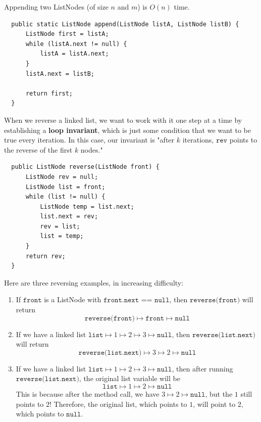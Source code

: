   \begin{theorem}[Appending]
  Appending two ListNodes (of size $n$ and $m$) is $O(n)$ time.
  \begin{lstlisting}
  public static ListNode append(ListNode listA, ListNode listB) {
      ListNode first = listA; 
      while (listA.next != null) {
          listA = listA.next; 
      }
      listA.next = listB; 
      
      return first; 
  }
  \end{lstlisting}
  \end{theorem}

  \begin{theorem}[Reversing]
  When we reverse a linked list, we want to work with it one step at a time by establishing a \textbf{loop invariant}, which is just some condition that we want to be true every iteration. In this case, our invariant is "after $k$ iterations, $\texttt{rev}$ points to the reverse of the first $k$ nodes." 
  \begin{lstlisting}
  public ListNode reverse(ListNode front) {
      ListNode rev = null; 
      ListNode list = front; 
      while (list != null) {
          ListNode temp = list.next; 
          list.next = rev; 
          rev = list; 
          list = temp; 
      }
      return rev; 
  }
  \end{lstlisting}
  \end{theorem}

  \begin{example}
  Here are three reversing examples, in increasing difficulty: 
  \begin{enumerate}
      \item If $\texttt{front}$ is a ListNode with $\texttt{front.next == null}$, then $\texttt{reverse(front)}$ will return 
      \[\texttt{reverse(front)} \mapsto \texttt{front} \mapsto \texttt{null}\]
      \item If we have a linked list $\texttt{list} \mapsto 1 \mapsto 2 \mapsto 3 \mapsto \texttt{null}$, then $\texttt{reverse(list.next)}$ will return 
      \[\texttt{reverse(list.next)} \mapsto 3 \mapsto 2 \mapsto \texttt{null} \]
      \item If we have a linked list $\texttt{list} \mapsto 1 \mapsto 2 \mapsto 3 \mapsto \texttt{null}$, then after running $\texttt{reverse(list.next)}$, the original list variable will be 
      \[\texttt{list} \mapsto 1 \mapsto 2 \mapsto \texttt{null}\]
      This is because after the method call, we have $3 \mapsto 2 \mapsto \texttt{null}$, but the $1$ still points to $2$! Therefore, the original list, which points to $1$, will point to $2$, which points to $\texttt{null}$. 
  \end{enumerate}
  \end{example}

